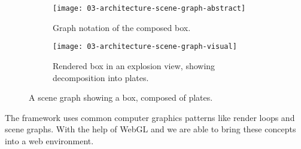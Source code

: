 \documentclass[../../ClassicThesis.tex]{subfiles}
\begin{document}
\begin{figure}[H]
  \centering
  \begin{subfigure}[b]{0.49\textwidth}
    \centering
    \texttt{[image: 03-architecture-scene-graph-abstract]}
    \caption{Graph notation of the composed box.}
    \label{fig:scene-graph:abstract}
  \end{subfigure}
  \begin{subfigure}[b]{0.49\textwidth}
    \centering
    \texttt{[image: 03-architecture-scene-graph-visual]}
    \caption{Rendered box in an explosion view, showing decomposition into plates.}
    \label{fig:scene-graph:visual}
  \end{subfigure}
  \caption{A scene graph showing a box, composed of plates.}
  \label{fig:scene-graph}
\end{figure}


The framework {\convertify} uses common computer graphics
patterns like render loops and scene graphs. With the help
of WebGL and {\threejs} we are able to bring these concepts
into a web environment.
\end{document}
